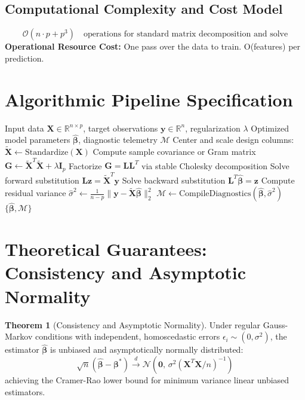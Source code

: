 \documentclass[11pt,a4paper]{article}
\theoremstyle{definition}
\newtheorem{theorem}{\textbf{Theorem}}[section]
\begin{document}
\subsection{Computational Complexity and Cost Model}
\begin{equation}
\mathcal{O}(n \cdot p + p^3) \quad \text{operations for standard matrix decomposition and solve}
\end{equation}
\textbf{Operational Resource Cost:} One pass over the data to train. O(features) per prediction.

\section{Algorithmic Pipeline Specification}

\begin{algorithm}[H]
\caption{Naive Bayes classifiers Execution}
\begin{algorithmic}[1]
\Require Input data $\mathbf{X} \in \mathbb{R}^{n \times p}$, target observations $\mathbf{y} \in \mathbb{R}^n$, regularization $\lambda$
\Ensure Optimized model parameters $\hat{\boldsymbol{\beta}}$, diagnostic telemetry $\mathcal{M}$
\State Center and scale design columns: $\tilde{\mathbf{X}} \gets \text{Standardize}(\mathbf{X})$
\State Compute sample covariance or Gram matrix $\mathbf{G} \gets \tilde{\mathbf{X}}^T \tilde{\mathbf{X}} + \lambda \mathbf{I}_p$
\State Factorize $\mathbf{G} = \mathbf{L} \mathbf{L}^T$ via stable Cholesky decomposition
\State Solve forward substitution $\mathbf{L} \mathbf{z} = \tilde{\mathbf{X}}^T \mathbf{y}$
\State Solve backward substitution $\mathbf{L}^T \hat{\boldsymbol{\beta}} = \mathbf{z}$
\State Compute residual variance $\hat{\sigma}^2 \gets \frac{1}{n - p} \| \mathbf{y} - \tilde{\mathbf{X}} \hat{\boldsymbol{\beta}} \|_2^2$
\State $\mathcal{M} \gets \text{CompileDiagnostics}(\hat{\boldsymbol{\beta}}, \hat{\sigma}^2)$
\State \Return $\{\hat{\boldsymbol{\beta}}, \mathcal{M}\}$
\end{algorithmic}
\end{algorithm}

\section{Theoretical Guarantees: Consistency and Asymptotic Normality}

\begin{theorem}[Consistency and Asymptotic Normality]
Under regular Gauss-Markov conditions with independent, homoscedastic errors $\epsilon_i \sim (0, \sigma^2)$, the estimator $\hat{\boldsymbol{\beta}}$ is unbiased and asymptotically normally distributed:
\begin{equation}
\sqrt{n}(\hat{\boldsymbol{\beta}} - \boldsymbol{\beta}^*) \xrightarrow{d} \mathcal{N}\left(\mathbf{0}, \, \sigma^2 (\mathbf{X}^T \mathbf{X} / n)^{-1}\right)
\end{equation}
achieving the Cramer-Rao lower bound for minimum variance linear unbiased estimators.
\end{theorem}
\end{document}
